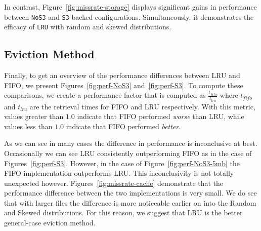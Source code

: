 In contrast, Figure~\ref{fig:missrate-storage} displays significant gains in
performance between {\tt NoS3} and {\tt S3}-backed configurations.
Simultaneously, it demonstrates the efficacy of {\tt LRU} with random and
skewed distributions.

\subsection{Eviction Method} %
Finally, to get an overview of the performance differences between LRU and
FIFO, we present Figures~\ref{fig:perf-NoS3} and~\ref{fig:perf-S3}. To compute
these comparisons, we create a performance factor that is computed as
$\frac{t_{fifo}}{t_{lru}}$ where $t_{fifo}$ and $t_{lru}$ are the retrieval
times for FIFO and LRU respectively. With this metric, values greater than
$1.0$ indicate that FIFO performed \emph{worse} than LRU, while values less
than $1.0$ indicate that FIFO performed \emph{better}.

As we can see in many cases the difference in performance is inconclusive at
best. Occasionally we can see LRU consistently outperforming FIFO as in the
case of Figures~\ref{fig:perf-S3}. However, in the case of
Figure~\ref{fig:perf-NoS3-5mb} the FIFO implementation outperforms LRU\@. This
inconclusivity is not totally unexpected however.
Figures~\ref{fig:missrate-cache} demonstrate that the performance difference
between the two implementations is very small. We do see that with larger files
the difference is more noticeable earlier on into the Random and Skewed
distributions. For this reason, we suggest that LRU is the better general-case
eviction method.

